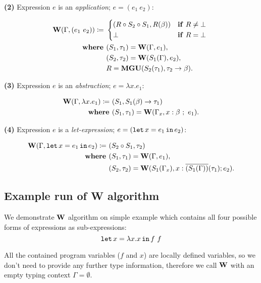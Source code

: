 \documentclass[a4paper,oneside]{memoir}
\begin{document}
\textbf{(2)} Expression $e$ is an \textit{application}; $e = (e_1~e_2)$:

\begin{align*}
\W(\Gamma, (e_1~e_2)) \defi ~ & 
\begin{cases*}
  (R \circ S_2 \circ S_1, R(\beta) ) & \textbf{if} $R \neq \bot$ \\
  \bot & \textbf{if} $R = \bot$
\end{cases*}\\
\where & (S_1, \tau_1) = \W(\Gamma, e_1), \\
       & (S_2, \tau_2) = \W(S_1(\Gamma), e_2), \\
       & R = \Mgu( S_2(\tau_1), \tau_2 \ar \beta ).\\
\end{align*}


\textbf{(3)} Expression $e$ is an \textit{abstraction}; $e = \lambda x . e_1$:

\begin{align*}
\operatorname{\textbf{W}}(\Gamma, \lambda x .e_1) \coloneqq ~ & (S_1, S_1(\beta) \rightarrow \tau_1 ) \\
\operatorname{\textbf{where~}} & (S_1, \tau_1) = \operatorname{\textbf{W}}(\Gamma_x, x : \beta ~;~ e_1). \\
\end{align*}



\textbf{(4)} Expression $e$ is a \textit{let-expression}; $e = (\texttt{let} \, x = e_1 \, \texttt{in} \, e_2)$:

\begin{align*}
\operatorname{\textbf{W}}(\Gamma, \texttt{let} \, x = e_1 \, \texttt{in} \, e_2) \coloneqq ~ & (S_2 \circ S_1, \tau_2) \\
\operatorname{\textbf{where~}} & (S_1, \tau_1) = \operatorname{\textbf{W}}(\Gamma, e_1), \\
       & (S_2, \tau_2) = \operatorname{\textbf{W}}(S_1(\Gamma_x),x:\overline{(S_1(\Gamma))}(\tau_1); e_2). \\
\end{align*}

\subsection{Example run of W algorithm}

We demonstrate $\operatorname{\textbf{W}}$ algorithm on simple example which contains all four possible forms of expressions as sub-expressions:
$$\texttt{let} \, x = \lambda x . x \, \texttt{in} \, f~f$$

All the contained program variables
($f$ and $x$) are locally defined variables, so we don't need to provide any further type
information, therefore we call $\operatorname{\textbf{W}}$ with an empty typing context $\Gamma = \emptyset$. 
\end{document}
